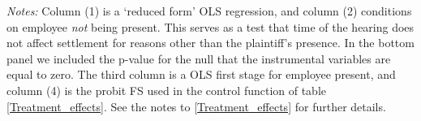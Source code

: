  

\begin{table}[!ht]
    \caption{First stage and robustness for the control function regression}
    \label{table_fs_cf}
    \begin{center}
    \scriptsize{}
    \end{center}
     \scriptsize
    \textit{Notes:}  Column (1) is a `reduced form' OLS regression, and column (2) conditions on employee \emph{not} being present. This serves as a test that time of the hearing does not affect settlement for reasons other than the plaintiff's presence. In the bottom panel we included the p-value for the null that the instrumental variables are equal to zero. The third column is a OLS first stage for employee present, and column (4) is the probit FS used in the control function of table \ref{Treatment_effects}. See the notes to \ref{Treatment_effects} for further details. 
         
\end{table}

         



